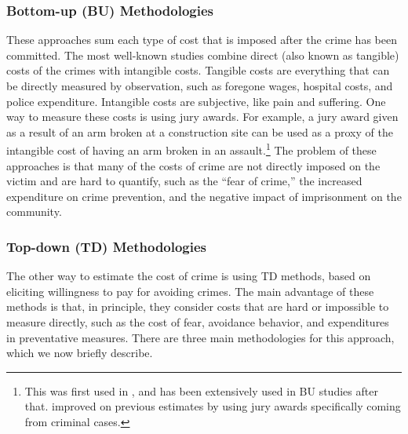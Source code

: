 \subsubsection{Bottom-up (BU) Methodologies}
\noindent These approaches sum each type of cost that is imposed after the crime has been committed. The most well-known studies combine direct (also known as tangible) costs of the crimes with intangible costs. Tangible costs are everything that can be directly measured by observation, such as foregone wages, hospital costs, and police expenditure. Intangible costs are subjective, like pain and suffering. One way to measure these costs is using jury awards. For example, a jury award given as a result of an arm broken at a construction site can be used as a proxy of the intangible cost of having an arm broken in an assault.\footnote{This was first used in \citet{cohen_1988_Pain-Suffering}, and has been extensively used in BU studies after that. \citet{Miller_Cohen_ea_1996_BOOKvictim} improved on previous estimates by using jury awards specifically coming from criminal cases.} The problem of these approaches is that many of the costs of crime are not directly imposed on the victim and are hard to quantify, such as the ``fear of crime,'' the increased expenditure on crime prevention, and the negative impact of imprisonment on the community. 

\subsubsection{Top-down (TD) Methodologies}
\noindent The other way to estimate the cost of crime is using TD methods, based on eliciting willingness to pay for avoiding crimes. The main advantage of these methods is that, in principle, they consider costs that are hard or impossible to measure directly, such as the cost of fear, avoidance behavior, and expenditures in preventative measures. There are three main methodologies for this approach, which we now briefly describe. 

